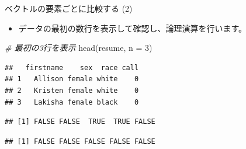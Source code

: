 \documentclass[
  ignorenonframetext,
]{beamer}
\newenvironment{Shaded}{\begin{snugshade}}{\end{snugshade}}
\newcommand{\AttributeTok}[1]{\textcolor[rgb]{0.77,0.63,0.00}{#1}}
\newcommand{\CommentTok}[1]{\textcolor[rgb]{0.56,0.35,0.01}{\textit{#1}}}
\newcommand{\DecValTok}[1]{\textcolor[rgb]{0.00,0.00,0.81}{#1}}
\newcommand{\FunctionTok}[1]{\textcolor[rgb]{0.00,0.00,0.00}{#1}}
\newcommand{\NormalTok}[1]{#1}
\newcommand{\SpecialCharTok}[1]{\textcolor[rgb]{0.00,0.00,0.00}{#1}}
\newcommand{\StringTok}[1]{\textcolor[rgb]{0.31,0.60,0.02}{#1}}
\providecommand{\tightlist}{%
  \setlength{\itemsep}{0pt}\setlength{\parskip}{0pt}}
\begin{document}
\begin{frame}[fragile]{ベクトルの要素ごとに比較する (2)}
\protect\hypertarget{ux30d9ux30afux30c8ux30ebux306eux8981ux7d20ux3054ux3068ux306bux6bd4ux8f03ux3059ux308b-2}{}
\begin{itemize}
\tightlist
\item
  データの最初の数行を表示して確認し、論理演算を行います。
\end{itemize}

\scriptsize

\begin{Shaded}
\begin{Highlighting}[]
\CommentTok{\# 最初の3行を表示}
\FunctionTok{head}\NormalTok{(resume, }\AttributeTok{n =} \DecValTok{3}\NormalTok{)}
\end{Highlighting}
\end{Shaded}

\begin{verbatim}
##   firstname    sex  race call
## 1   Allison female white    0
## 2   Kristen female white    0
## 3   Lakisha female black    0
\end{verbatim}

\begin{Shaded}
\end{Shaded}

\begin{verbatim}
## [1] FALSE FALSE  TRUE  TRUE FALSE
\end{verbatim}

\begin{Shaded}
\end{Shaded}

\begin{verbatim}
## [1] FALSE FALSE FALSE FALSE FALSE
\end{verbatim}

\normalsize
\end{frame}
\end{document}
